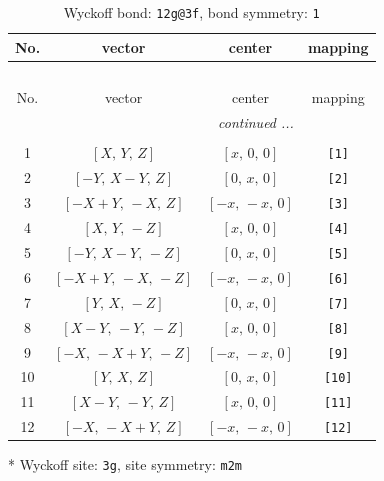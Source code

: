 \documentclass[fleqn,8pt]{jsarticle}
\begin{document}
\begin{longtable}{cccc}
\caption{Wyckoff bond: {\tt 12g@3f}, bond symmetry: {\tt 1}}
 \\
 \hline \hline
No. & vector & center & mapping \\ \hline \endfirsthead

\multicolumn{3}{l}{\tablename\ \thetable{}} \\
 \hline \hline
No. & vector & center & mapping \\ \hline \endhead

 \hline \hline
\multicolumn{3}{r}{\footnotesize\it continued ...} \\ \endfoot

 \hline \hline
\multicolumn{3}{r}{} \\ \endlastfoot

1 & $\left[ X,\, Y,\, Z \right]$ & $\left[ x,\, 0,\, 0 \right]$ & {\tt [1]} \\ \hline
2 & $\left[ - Y,\, X - Y,\, Z \right]$ & $\left[ 0,\, x,\, 0 \right]$ & {\tt [2]} \\ \hline
3 & $\left[ - X + Y,\, - X,\, Z \right]$ & $\left[ - x,\, - x,\, 0 \right]$ & {\tt [3]} \\ \hline
4 & $\left[ X,\, Y,\, - Z \right]$ & $\left[ x,\, 0,\, 0 \right]$ & {\tt [4]} \\ \hline
5 & $\left[ - Y,\, X - Y,\, - Z \right]$ & $\left[ 0,\, x,\, 0 \right]$ & {\tt [5]} \\ \hline
6 & $\left[ - X + Y,\, - X,\, - Z \right]$ & $\left[ - x,\, - x,\, 0 \right]$ & {\tt [6]} \\ \hline
7 & $\left[ Y,\, X,\, - Z \right]$ & $\left[ 0,\, x,\, 0 \right]$ & {\tt [7]} \\ \hline
8 & $\left[ X - Y,\, - Y,\, - Z \right]$ & $\left[ x,\, 0,\, 0 \right]$ & {\tt [8]} \\ \hline
9 & $\left[ - X,\, - X + Y,\, - Z \right]$ & $\left[ - x,\, - x,\, 0 \right]$ & {\tt [9]} \\ \hline
10 & $\left[ Y,\, X,\, Z \right]$ & $\left[ 0,\, x,\, 0 \right]$ & {\tt [10]} \\ \hline
11 & $\left[ X - Y,\, - Y,\, Z \right]$ & $\left[ x,\, 0,\, 0 \right]$ & {\tt [11]} \\ \hline
12 & $\left[ - X,\, - X + Y,\, Z \right]$ & $\left[ - x,\, - x,\, 0 \right]$ & {\tt [12]} \\
\end{longtable}
* Wyckoff site: {\tt 3g}, site symmetry: {\tt m2m}
\renewcommand{\arraystretch}{1.2}
\end{document}
